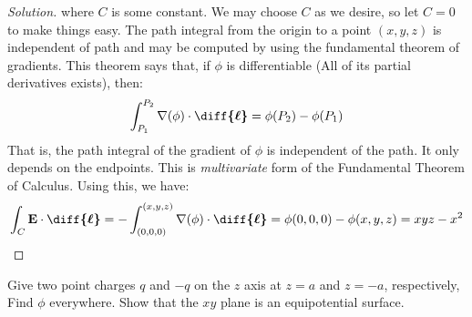 \documentclass[crop=false,class=book,oneside]{standalone}
\begin{document}
\begin{proof}[Solution]
                where $C$ is some constant. We may choose $C$ as we desire,
                so let $C=0$ to make things easy. The path integral
                from the origin to a point $(x,y,z)$ is independent
                of path and may be computed by using the fundamental
                theorem of gradients. This theorem says that,
                if $\phi$ is differentiable
                (All of its partial derivatives exists), then:
                \begin{equation*}
                    \int_{P_{1}}^{P_{2}}
                    \nabla(\phi)\cdot\boldsymbol{\diff{\ell}}
                    =\phi(P_{2})-\phi(P_{1})
                \end{equation*}
                That is, the path integral of the gradient of
                $\phi$ is independent of the path. It only depends
                on the endpoints.
                This is \textit{multivariate} form of the
                Fundamental Theorem of Calculus. Using this, we have:
                \begin{align*}
                    \int_{C}\mathbf{E}\cdot\boldsymbol{\diff{\ell}}
                    =-\int _{(0,0,0)}^{(x,y,z)}
                    \nabla(\phi)\cdot\boldsymbol{\diff{\ell}}
                    =\phi(0,0,0)-\phi(x,y,z)
                    =xyz-x^2
                \end{align*}
            \end{proof}
            \begin{problem}[Wangsness 5-3]
                \label{problem:EMAG_Wangsness_5_3}
                Give two point charges $q$ and $-q$ on the
                $z$ axis at $z=a$ and $z=-a$, respectively,
                Find $\phi$ everywhere. Show that the
                $xy$ plane is an equipotential surface.
            \end{problem}
\end{document}
